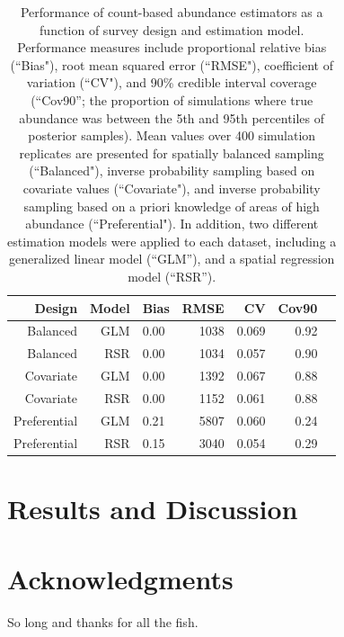 \documentclass[fleqn,10pt]{wlpeerj}
\begin{document}
\begin{table}[ht]
\label{tab:PS}
\caption{Performance of count-based abundance estimators as a function of survey design and estimation model.  Performance measures include proportional relative bias (``Bias"), root mean squared error (``RMSE"), coefficient of variation (``CV"), and 90\% credible interval coverage (``Cov90''; the proportion of simulations where true abundance was between the 5th and 95th percentiles of posterior samples).  Mean values over 400 simulation replicates are presented for spatially balanced sampling (``Balanced"), inverse probability sampling based on covariate values (``Covariate"), and inverse probability sampling based on a priori knowledge of areas of high abundance (``Preferential"). In addition, two different estimation models were applied to each dataset, including a generalized linear model (``GLM''), and a spatial regression model (``RSR'').} 
\centering
\begin{tabular}{rrlrrrr}
  \hline
 Design & Model & Bias & RMSE & CV & Cov90 \\ 
  \hline
Balanced & GLM & 0.00 & 1038 & 0.069 & 0.92 \\ 
Balanced & RSR & 0.00 & 1034 & 0.057 & 0.90 \\ 
Covariate & GLM & 0.00 & 1392 & 0.067 & 0.88 \\ 
Covariate & RSR & 0.00 & 1152 & 0.061 & 0.88 \\ 
Preferential & GLM & 0.21 & 5807 & 0.060 & 0.24 \\ 
Preferential & RSR & 0.15 & 3040 & 0.054 & 0.29 \\ 
   \hline
\end{tabular}
\end{table}


\section*{Results and Discussion}


\section*{Acknowledgments}

So long and thanks for all the fish.


\end{document}
